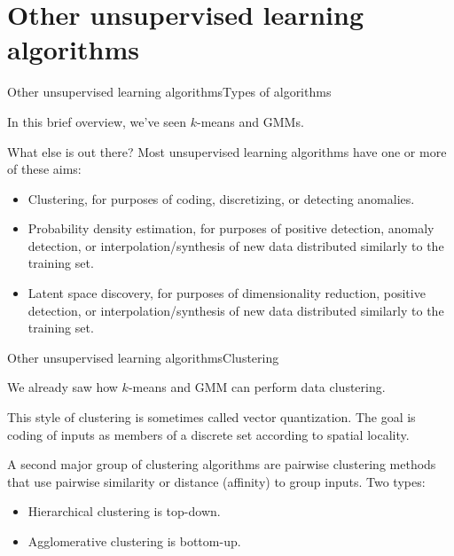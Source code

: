 \documentclass{beamer}
\begin{document}
\fi

\section{Other unsupervised learning algorithms}

\begin{frame}{Other unsupervised learning algorithms}{Types of algorithms}

  In this brief overview, we've seen $k$-means and GMMs.

  \medskip

  What else is out there?  Most unsupervised learning
  algorithms have one or more of these aims:
  \begin{itemize}
    \item Clustering, for purposes of coding, discretizing, or detecting
      anomalies.
    \item Probability density estimation, for purposes of positive
      detection, anomaly detection, or interpolation/synthesis of new
      data distributed similarly to the training set.
    \item Latent space discovery, for purposes of dimensionality reduction,
      positive detection, or interpolation/synthesis of new data distributed
      similarly to the training set.
  \end{itemize}

\end{frame}


\begin{frame}{Other unsupervised learning algorithms}{Clustering}

  We already saw how $k$-means and GMM can perform data clustering.

  \medskip

  This style of clustering is sometimes called \alert{vector
  quantization}.  The goal is coding of inputs as members of a
  discrete set according to spatial locality.

  \medskip

  A second major group of clustering algorithms are \alert{pairwise
  clustering methods} that use pairwise similarity or distance
  (affinity) to group inputs. Two types:
  \begin{itemize}
    \item \alert{Hierarchical clustering} is top-down.
    \item \alert{Agglomerative clustering} is bottom-up.
  \end{itemize}

\end{frame}
\end{document}

